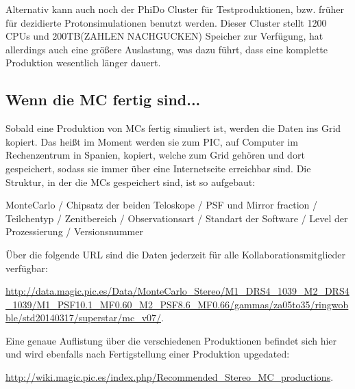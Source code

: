 Alternativ kann auch noch der PhiDo Cluster für Testproduktionen, bzw. früher für dezidierte Protonsimulationen benutzt werden. 
Dieser Cluster stellt 1200 CPUs und 200TB(ZAHLEN NACHGUCKEN) Speicher zur Verfügung, hat allerdings auch eine größere Auslastung, was dazu führt, dass eine komplette Produktion wesentlich länger dauert.



\subsection{Wenn die MC fertig sind...}
\label{sec:Wenn die MCs fertig sind}
Sobald eine Produktion von MCs fertig simuliert ist, werden die Daten ins Grid kopiert.
Das heißt im Moment werden sie zum PIC, auf Computer im Rechenzentrum in Spanien, kopiert, welche zum Grid gehören und dort gespeichert, sodass sie immer über eine Internetseite erreichbar sind.
Die Struktur, in der die MCs gespeichert sind, ist so aufgebaut:\newline 

MonteCarlo / Chipsatz der beiden Teloskope / PSF und Mirror fraction / Teilchentyp / Zenitbereich / Observationsart / Standart der Software / Level der Prozessierung / Versionsnummer \newline

Über die folgende URL sind die Daten jederzeit für alle Kollaborationsmitglieder verfügbar:

\url{http://data.magic.pic.es/Data/MonteCarlo_Stereo/M1_DRS4_1039_M2_DRS4_1039/M1_PSF10.1_MF0.60_M2_PSF8.6_MF0.66/gammas/za05to35/ringwobble/std20140317/superstar/mc_v07/}.

Eine genaue Auflistung über die verschiedenen Produktionen befindet sich hier und wird ebenfalls nach Fertigstellung einer Produktion upgedated:

\url{http://wiki.magic.pic.es/index.php/Recommended_Stereo_MC_productions}.


